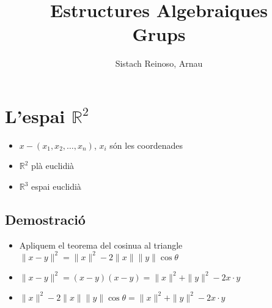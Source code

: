 \documentclass{article}
\title{Estructures Algebraiques\\Grups}
\author{Sistach Reinoso, Arnau}
\newcommand{\R}{\mathbb{R}}
\begin{document}
\maketitle
\tableofcontents

\section{L'espai $\R^2$}
\begin{itemize}
\item $x - (x_1, x_2, \dots, x_n)$, $x_i$ són les coordenades
\item $\R^2$ plà euclidià
\item $\R^3$ espai euclidià
\end{itemize}

\subsection{Demostració}
\begin{itemize}
\item Apliquem el teorema del cosinua al triangle
\subitem $\|x-y\|^2 = \|x\|^2 - 2 \|x\|\|y\| \cos{\theta}$
\item $\|x-y\|^2 = (x - y) (x - y) = \|x\|^2 + \|y\|^2 - 2x\cdot y$
\item $\|x\|^2 - 2 \|x\|\|y\| \cos{\theta} = \|x\|^2 + \|y\|^2 - 2x\cdot y$
\end{itemize}
\end{document}
